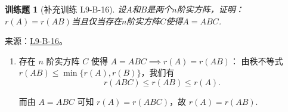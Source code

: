 \documentclass[12pt,fontset=fandol]{ctexart}
\newtheorem{exercise}{训练题}[section]
\begin{document}
\begin{exercise}[补充训练 L9-B-16]\label{prob:L9-B-16}
设$A$和$B$是两个$n$阶实方阵，证明：$r(A)=r(AB)$当且仅当存在$n$阶实方阵$C$使得$A=ABC$.
\end{exercise}
\noindent 来源：\href{https://github.com/yhwu-is/Linear-Algebra-Left-Undone/blob/new/%E8%AE%B2%E4%B9%89/%E4%B8%93%E9%A2%98/9%20%E7%9F%A9%E9%98%B5%E8%BF%90%E7%AE%97%E8%BF%9B%E9%98%B6.tex}{L9-B-16}。
\begin{solve}
\begin{enumerate}
                \item 存在 $n$ 阶实方阵 $C$ 使得 $A = ABC \implies r(A) = r(AB)$：
                    由秩不等式 $r(AB) \leqslant \min\{r(A), r(B)\}$，我们有
                    \[
                        r(ABC) \leqslant r(AB) \leqslant r(A).
                    \]

                    而由 $A=ABC$ 可知 $r(A) = r(ABC)$，故 $r(A) = r(AB)$.


\end{enumerate}
\end{solve}
\end{document}
